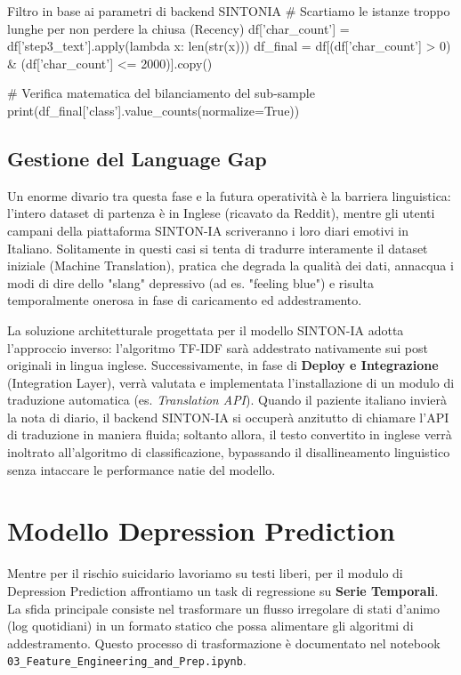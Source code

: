 \begin{codebox}{Filtro in base ai parametri di backend SINTONIA}
# Scartiamo le istanze troppo lunghe per non perdere la chiusa (Recency)
df['char_count'] = df['step3_text'].apply(lambda x: len(str(x)))
df_final = df[(df['char_count'] > 0) & (df['char_count'] <= 2000)].copy()

# Verifica matematica del bilanciamento del sub-sample
print(df_final['class'].value_counts(normalize=True))
\end{codebox}

\subsection{Gestione del Language Gap}
Un enorme divario tra questa fase e la futura operatività è la barriera linguistica: l'intero dataset di partenza è in Inglese (ricavato da Reddit), mentre gli utenti campani della piattaforma SINTON-IA scriveranno i loro diari emotivi in Italiano. 
Solitamente in questi casi si tenta di tradurre interamente il dataset iniziale (Machine Translation), pratica che degrada la qualità dei dati, annacqua i modi di dire dello "slang" depressivo (ad es. "feeling blue") e risulta temporalmente onerosa in fase di caricamento ed addestramento. 

La soluzione architetturale progettata per il modello SINTON-IA adotta l'approccio inverso: l'algoritmo TF-IDF sarà addestrato nativamente sui post originali in lingua inglese. Successivamente, in fase di \textbf{Deploy e Integrazione} (Integration Layer), verrà valutata e implementata l'installazione di un modulo di traduzione automatica (es. \textit{Translation API}). Quando il paziente italiano invierà la nota di diario, il backend SINTON-IA si occuperà anzitutto di chiamare l'API di traduzione in maniera fluida; soltanto allora, il testo convertito in inglese verrà inoltrato all'algoritmo di classificazione, bypassando il disallineamento linguistico senza intaccare le performance natie del modello.

\clearpage
\section{Modello Depression Prediction}
\label{sec:prep_depression}

Mentre per il rischio suicidario lavoriamo su testi liberi, per il modulo di Depression Prediction affrontiamo un task di regressione su \textbf{Serie Temporali}. La sfida principale consiste nel trasformare un flusso irregolare di stati d'animo (log quotidiani) in un formato statico che possa alimentare gli algoritmi di addestramento. Questo processo di trasformazione è documentato nel notebook \texttt{03\_Feature\_Engineering\_and\_Prep.ipynb}.


